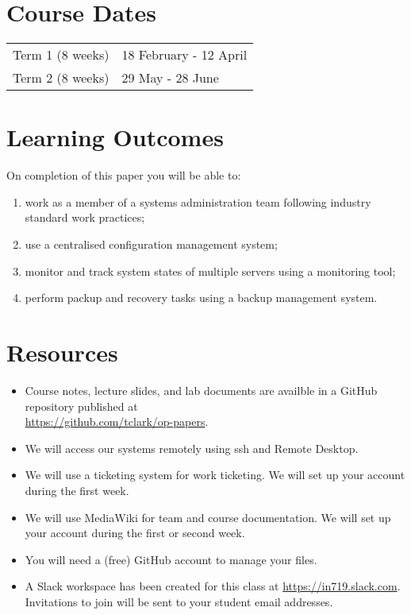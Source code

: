 \documentclass{article}
\begin{document}
\section*{Course Dates}
\begin{tabular}{ll}
Term 1 (8 weeks) & 18 February - 12 April\\
Term 2 (8 weeks) & 29 May - 28 June\\
\end{tabular}

\newpage 

\section*{Learning Outcomes}
On completion of this paper you will be able to:
\begin{enumerate}
  \item work as a member of a systems administration team following industry standard work practices;
  \item use a centralised configuration management system;
  \item monitor and track system states of multiple servers using a monitoring tool;
  \item perform packup and recovery tasks using a backup management system.
\end{enumerate}

\section*{Resources}
\begin{itemize}
	\item Course notes, lecture slides, and lab documents are availble in a GitHub repository published at \\ \url{https://github.com/tclark/op-papers}.
	\item We will access our systems remotely using ssh and Remote Desktop.
	\item We will use a ticketing system for work ticketing. We will set up your account during the first week.
	\item We will use MediaWiki for team and course documentation. We will set up your account during the first or second week.
	\item You will need a (free) GitHub account to manage your files.
	\item A Slack workspace has been created for this class at \url{https://in719.slack.com}. Invitations to join will be sent to your student email addresses.
\end{itemize}
\end{document}
